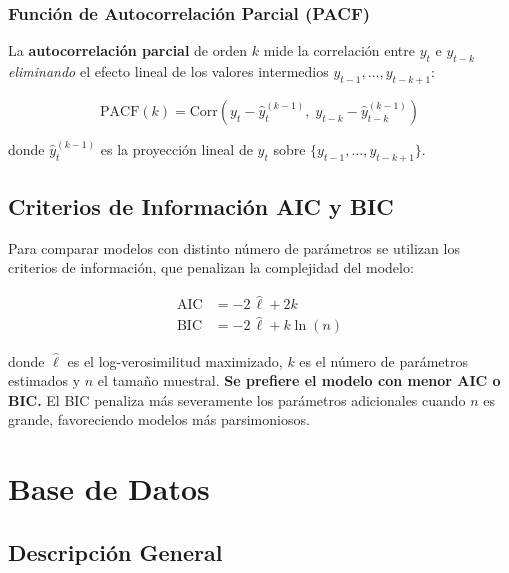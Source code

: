 \documentclass[12pt, a4paper]{article}
\begin{document}
\subsubsection{Función de Autocorrelación Parcial (PACF)}

La \textbf{autocorrelación parcial} de orden $k$ mide la correlación entre
$y_t$ e $y_{t-k}$ \emph{eliminando} el efecto lineal de los valores
intermedios $y_{t-1}, \ldots, y_{t-k+1}$:

\begin{equation}
  \text{PACF}(k) = \text{Corr}(y_t - \hat{y}_t^{(k-1)},\; y_{t-k} - \hat{y}_{t-k}^{(k-1)})
  \label{eq:pacf}
\end{equation}

donde $\hat{y}_t^{(k-1)}$ es la proyección lineal de $y_t$ sobre
$\{y_{t-1}, \ldots, y_{t-k+1}\}$.

\subsection{Criterios de Información AIC y BIC}

Para comparar modelos con distinto número de parámetros se utilizan los
criterios de información, que penalizan la complejidad del modelo:

\begin{defbox}
\begin{align}
  \text{AIC} &= -2\,\hat{\ell} + 2k \label{eq:aic} \\[4pt]
  \text{BIC} &= -2\,\hat{\ell} + k\ln(n) \label{eq:bic}
\end{align}
\end{defbox}

donde $\hat{\ell}$ es el log-verosimilitud maximizado, $k$ es el número de
parámetros estimados y $n$ el tamaño muestral. \textbf{Se prefiere el modelo
con menor AIC o BIC.} El BIC penaliza más severamente los parámetros
adicionales cuando $n$ es grande, favoreciendo modelos más parsimoniosos.

\section{Base de Datos}

\subsection{Descripción General}
\end{document}
